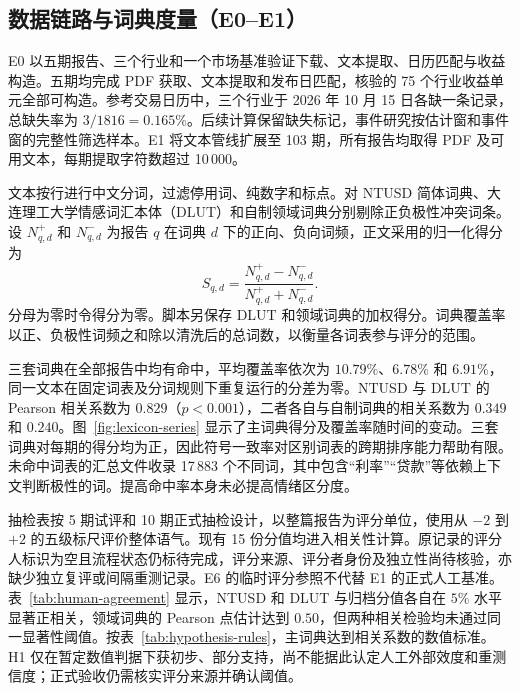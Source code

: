 \subsection{数据链路与词典度量（E0--E1）}

E0 以五期报告、三个行业和一个市场基准验证下载、文本提取、日历匹配与收益构造。五期均完成 PDF 获取、文本提取和发布日匹配，核验的 75 个行业收益单元全部可构造。参考交易日历中，三个行业于 2026 年 10 月 15 日各缺一条记录，总缺失率为 $3/1816=0.165\%$。后续计算保留缺失标记，事件研究按估计窗和事件窗的完整性筛选样本。E1 将文本管线扩展至 103 期，所有报告均取得 PDF 及可用文本，每期提取字符数超过 10\,000。

文本按行进行中文分词，过滤停用词、纯数字和标点。对 NTUSD 简体词典、大连理工大学情感词汇本体（DLUT）和自制领域词典分别剔除正负极性冲突词条。设 $N_{q,d}^{+}$ 和 $N_{q,d}^{-}$ 为报告 $q$ 在词典 $d$ 下的正向、负向词频，正文采用的归一化得分为
\begin{equation}
  S_{q,d}=\frac{N_{q,d}^{+}-N_{q,d}^{-}}{N_{q,d}^{+}+N_{q,d}^{-}}.
  \label{eq:dictionary-score}
\end{equation}
分母为零时令得分为零。脚本另保存 DLUT 和领域词典的加权得分。词典覆盖率以正、负极性词频之和除以清洗后的总词数，以衡量各词表参与评分的范围。

三套词典在全部报告中均有命中，平均覆盖率依次为 $10.79\%$、$6.78\%$ 和 $6.91\%$，同一文本在固定词表及分词规则下重复运行的分差为零。NTUSD 与 DLUT 的 Pearson 相关系数为 $0.829$（$p<0.001$），二者各自与自制词典的相关系数为 $0.349$ 和 $0.240$。图~\ref{fig:lexicon-series} 显示了主词典得分及覆盖率随时间的变动。三套词典对每期的得分均为正，因此符号一致率对区别词表的跨期排序能力帮助有限。未命中词表的汇总文件收录 17\,883 个不同词，其中包含“利率”“贷款”等依赖上下文判断极性的词。提高命中率本身未必提高情绪区分度。


抽检表按 5 期试评和 10 期正式抽检设计，以整篇报告为评分单位，使用从 $-2$ 到 $+2$ 的五级标尺评价整体语气。现有 15 份分值均进入相关性计算。原记录的评分人标识为空且流程状态仍标待完成，评分来源、评分者身份及独立性尚待核验，亦缺少独立复评或间隔重测记录。E6 的临时评分参照不代替 E1 的正式人工基准。表~\ref{tab:human-agreement} 显示，NTUSD 和 DLUT 与归档分值各自在 $5\%$ 水平显著正相关，领域词典的 Pearson 点估计达到 $0.50$，但两种相关检验均未通过同一显著性阈值。按表~\ref{tab:hypothesis-rules}，主词典达到相关系数的数值标准。H1 仅在暂定数值判据下获初步、部分支持，尚不能据此认定人工外部效度和重测信度；正式验收仍需核实评分来源并确认阈值。

